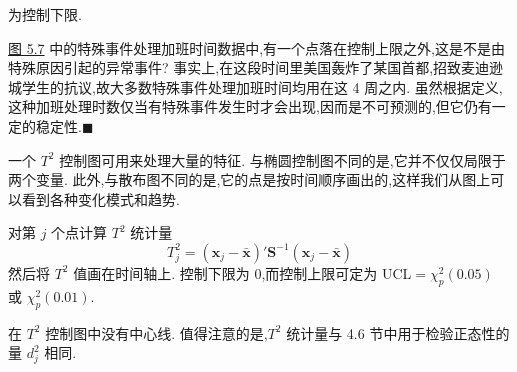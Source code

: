 为控制下限.

\hyperref[fig:5.7]{图 5.7} 中的特殊事件处理加班时间数据中,有一个点落在控制上限之外,这是不是由特殊原因引起的异常事件? 事实上,在这段时间里美国轰炸了某国首都,招致麦迪逊城学生的抗议,故大多数特殊事件处理加班时间均用在这 4 周之内. 虽然根据定义,这种加班处理时数仅当有特殊事件发生时才会出现,因而是不可预测的,但它仍有一定的稳定性.\hfill$\blacksquare$

\quad 一个 $T^{2}$ 控制图可用来处理大量的特征. 与椭圆控制图不同的是,它并不仅仅局限于两个变量. 此外,与散布图不同的是,它的点是按时间顺序画出的,这样我们从图上可以看到各种变化模式和趋势.

对第 $j$ 个点计算 $T^{2}$ 统计量
\label{eq:5-33}
\begin{equation}
T_j^{2}=(\mathbf{x}_j-\bar{\mathbf{x}})'\mathbf{S}^{-1}(\mathbf{x}_j-\bar{\mathbf{x}})
\tag{5-33}
\end{equation}
然后将 $T^{2}$ 值画在时间轴上. 控制下限为 0,而控制上限可定为 UCL$=\chi_p^{2}(0.05)$ 或 $\chi_p^{2}(0.01)$.

在 $T^{2}$ 控制图中没有中心线. 值得注意的是,$T^{2}$ 统计量与 4.6 节中用于检验正态性的量 $d_j^{2}$ 相同.
